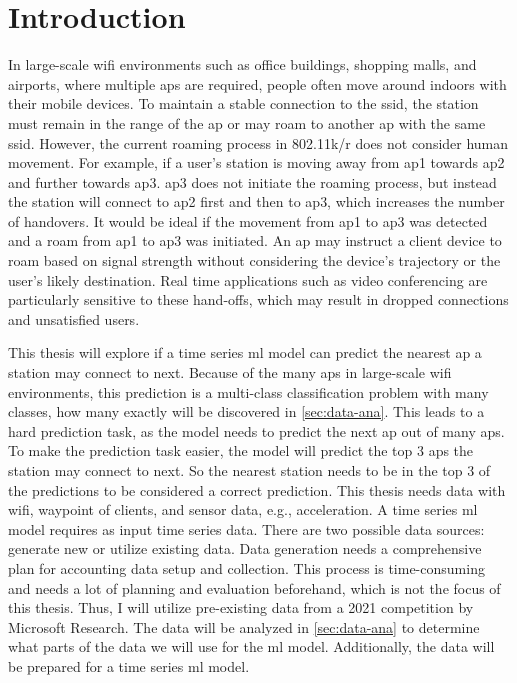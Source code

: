 \chapter{Introduction}\label{sec:intro}

In large-scale \ac{wifi} environments such as office buildings, shopping malls, and airports, where multiple \acp{ap} are required, people often move around indoors with their mobile devices.
To maintain a stable connection to the \ac{ssid}, the station must remain in the range of the \ac{ap} or may roam to another \ac{ap} with the same \ac{ssid}.
However, the current roaming process in 802.11k/r\cite{802.11k}\cite{802.11r} does not consider human movement.
For example, if a user's station is moving away from \ac{ap}1 towards \ac{ap}2 and further towards \ac{ap}3.
\ac{ap}3 does not initiate the roaming process, but instead the station will connect to \ac{ap}2 first and then to \ac{ap}3, which increases the number of handovers.
It would be ideal if the movement from \ac{ap}1 to \ac{ap}3 was detected and a roam from \ac{ap}1 to \ac{ap}3 was initiated.
An \ac{ap} may instruct a client device to roam based on signal strength without considering the device's trajectory or the user's likely destination.
Real time applications such as video conferencing are particularly sensitive to these hand-offs, which may result in dropped connections and unsatisfied users.

This thesis will explore if a time series \ac{ml} model can predict the nearest \ac{ap} a station may connect to next.
Because of the many \acp{ap} in large-scale \ac{wifi} environments, this prediction is a multi-class classification problem with many classes, how many exactly will be discovered in \cref{sec:data-ana}.
This leads to a hard prediction task, as the model needs to predict the next \ac{ap} out of many \acp{ap}.
To make the prediction task easier, the model will predict the top 3 \acp{ap} the station may connect to next.
So the nearest station needs to be in the top 3 of the predictions to be considered a correct prediction.
This thesis needs data with \ac{wifi}, waypoint of clients, and sensor data, e.g., acceleration.
A time series \ac{ml} model requires as input time series data.
There are two possible data sources: generate new or utilize existing data. 
Data generation needs a comprehensive plan for accounting data setup and collection.
This process is time-consuming and needs a lot of planning and evaluation beforehand, which is not the focus of this thesis.
Thus, I will utilize pre-existing data from a 2021 competition by Microsoft Research\cite{IndoorLocationNavigation}.
The data will be analyzed in \cref{sec:data-ana} to determine what parts of the data we will use for the \ac{ml} model.
Additionally, the data will be prepared for a time series \ac{ml} model.

